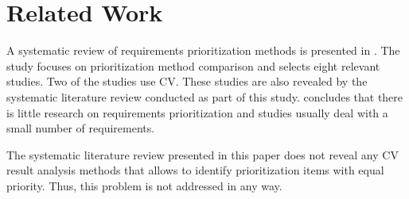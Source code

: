 \section{Related Work\label{relatedwork}}

A systematic review of requirements prioritization methods is presented in \cite{Khan2006}. The study focuses on prioritization method comparison and selects eight relevant studies. Two of the studies use CV. These studies are also revealed by the systematic literature review conducted as part of this study. \cite{Khan2006} concludes that there is little research on requirements prioritization and studies usually deal with a small number of requirements.

The systematic literature review presented in this paper does not reveal any CV result analysis methods that allows to identify prioritization items with equal priority. Thus, this problem is not addressed in any way.
